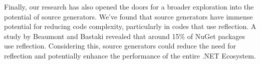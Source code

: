 Finally, our research has also opened the doors for a broader exploration into the potential of source generators. We've found that source generators have immense potential for reducing code complexity, particularly in codes that use reflection. A study by Beaumont and Bastaki \cite{Beaumont2022} revealed that around 15\% of NuGet packages use reflection. Considering this, source generators could reduce the need for reflection and potentially enhance the performance of the entire .NET Ecosystem.
